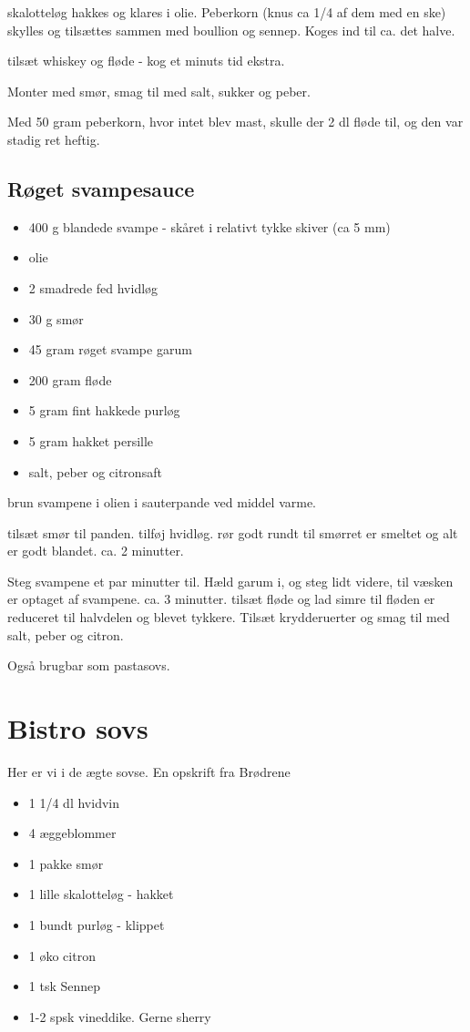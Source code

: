 \documentclass[
]{book}
\providecommand{\tightlist}{%
  \setlength{\itemsep}{0pt}\setlength{\parskip}{0pt}}
\begin{document}
skalotteløg hakkes og klares i olie.
Peberkorn (knus ca 1/4 af dem med en ske) skylles og tilsættes
sammen med boullion og sennep. Koges ind til ca. det halve.

tilsæt whiskey og fløde - kog et minuts tid ekstra.

Monter med smør, smag til med salt, sukker og peber.

Med 50 gram peberkorn, hvor intet blev mast, skulle der
2 dl fløde til, og den var stadig ret heftig.

\subsection{Røget svampesauce}\label{ruxf8get-svampesauce}

\begin{itemize}
\tightlist
\item
  400 g blandede svampe - skåret i relativt tykke skiver (ca 5 mm)
\item
  olie
\item
  2 smadrede fed hvidløg
\item
  30 g smør
\item
  45 gram røget svampe garum
\item
  200 gram fløde
\item
  5 gram fint hakkede purløg
\item
  5 gram hakket persille
\item
  salt, peber og citronsaft
\end{itemize}

brun svampene i olien i sauterpande ved middel varme.

tilsæt smør til panden. tilføj hvidløg. rør godt rundt til smørret er smeltet og alt er godt
blandet. ca. 2 minutter.

Steg svampene et par minutter til. Hæld garum i, og steg lidt videre, til
væsken er optaget af svampene. ca. 3 minutter.
tilsæt fløde og lad simre til fløden er reduceret til halvdelen og blevet tykkere.
Tilsæt krydderuerter og smag til med salt, peber og citron.

Også brugbar som pastasovs.

\section{Bistro sovs}\label{bistro-sovs}

Her er vi i de ægte sovse. En opskrift fra Brødrene

\begin{itemize}
\tightlist
\item
  1 1/4 dl hvidvin
\item
  4 æggeblommer
\item
  1 pakke smør
\item
  1 lille skalotteløg - hakket
\item
  1 bundt purløg - klippet
\item
  1 øko citron
\item
  1 tsk Sennep
\item
  1-2 spsk vineddike. Gerne sherry
\end{itemize}
\end{document}
